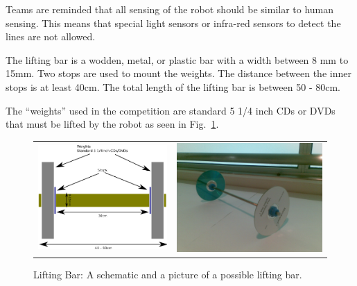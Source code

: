 \documentclass[12pt]{hurocup}
\begin{document}
\begin{decisions}

\item Teams are reminded that all sensing of the robot should be
  similar to human sensing. This means that special light sensors or
  infra-red sensors to detect the lines are not allowed.

\end{decisions}


\begin{lawlist}[WL]

\item The lifting bar is a wodden, metal, or plastic bar with a width
  between 8 mm to 15mm. Two stops are used to mount the weights. The
  distance between the inner stops is at least 40cm. The total length
  of the lifting bar is between 50 - 80cm.

\item The ``weights'' used in the competition are standard 5 1/4 inch
 CDs or DVDs that must be lifted by the robot as seen in
 Fig.~\ref{fig:lifting-bar}.

\begin{figure}
\begin{center}
\begin{tabular}{cc}
\includegraphics[width=0.4\linewidth]{Figures/lifting-bar-diagram} 
&
\includegraphics[width=0.4\linewidth]{Figures/lifting-bar1} 
\end{tabular}
\caption{Lifting Bar: A schematic and a picture of a possible lifting
bar.}
\label{fig:lifting-bar}
\end{center}
\end{figure}

\end{lawlist}
\end{document}
